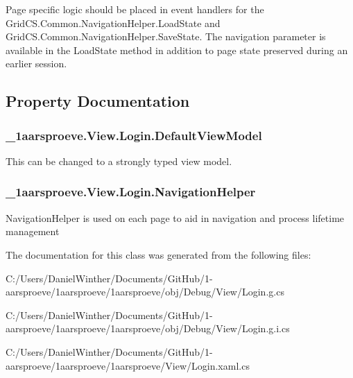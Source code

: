 Page specific logic should be placed in event handlers for the Grid\+C\+S.\+Common.\+Navigation\+Helper.\+Load\+State and Grid\+C\+S.\+Common.\+Navigation\+Helper.\+Save\+State. The navigation parameter is available in the Load\+State method in addition to page state preserved during an earlier session. 

\subsection{Property Documentation}
\hypertarget{class__1aarsproeve_1_1_view_1_1_login_a7955bd79c353b1dcdcfcd7b73874b0a6}{}
\subsubsection[{Default\+View\+Model}]{ \+\_\+1aarsproeve.\+View.\+Login.\+Default\+View\+Model\hspace{0.3cm}{\ttfamily [get]}}\label{class__1aarsproeve_1_1_view_1_1_login_a7955bd79c353b1dcdcfcd7b73874b0a6}


This can be changed to a strongly typed view model. 

\hypertarget{class__1aarsproeve_1_1_view_1_1_login_a6ce27e4b6c4ba6f4785c2d98d4685477}{}
\subsubsection[{Navigation\+Helper}]{ \+\_\+1aarsproeve.\+View.\+Login.\+Navigation\+Helper\hspace{0.3cm}{\ttfamily [get]}}\label{class__1aarsproeve_1_1_view_1_1_login_a6ce27e4b6c4ba6f4785c2d98d4685477}


Navigation\+Helper is used on each page to aid in navigation and process lifetime management 



The documentation for this class was generated from the following files\+:\begin{DoxyCompactItemize}
\item 
C\+:/\+Users/\+Daniel\+Winther/\+Documents/\+Git\+Hub/1-\/aarsproeve/1aarsproeve/1aarsproeve/obj/\+Debug/\+View/Login.\+g.\+cs\item 
C\+:/\+Users/\+Daniel\+Winther/\+Documents/\+Git\+Hub/1-\/aarsproeve/1aarsproeve/1aarsproeve/obj/\+Debug/\+View/Login.\+g.\+i.\+cs\item 
C\+:/\+Users/\+Daniel\+Winther/\+Documents/\+Git\+Hub/1-\/aarsproeve/1aarsproeve/1aarsproeve/\+View/Login.\+xaml.\+cs\end{DoxyCompactItemize}
